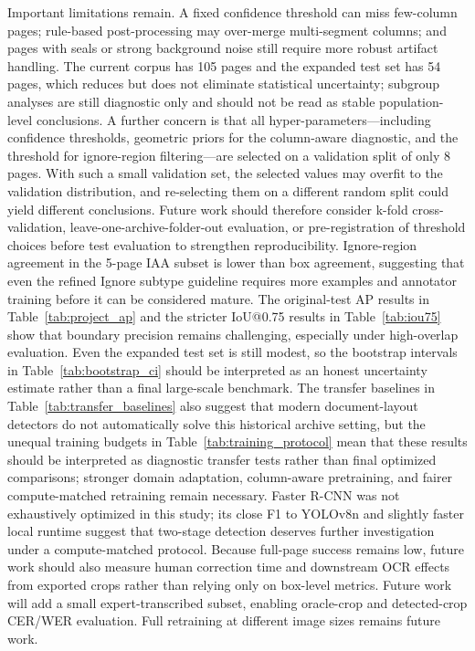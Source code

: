 \documentclass[pdflatex,sn-mathphys-num]{sn-jnl}
\begin{document}
Important limitations remain. A fixed confidence threshold can miss few-column pages; rule-based post-processing may over-merge multi-segment columns; and pages with seals or strong background noise still require more robust artifact handling. The current corpus has 105 pages and the expanded test set has 54 pages, which reduces but does not eliminate statistical uncertainty; subgroup analyses are still diagnostic only and should not be read as stable population-level conclusions. A further concern is that all hyper-parameters---including confidence thresholds, geometric priors for the column-aware diagnostic, and the threshold for ignore-region filtering---are selected on a validation split of only 8 pages. With such a small validation set, the selected values may overfit to the validation distribution, and re-selecting them on a different random split could yield different conclusions. Future work should therefore consider k-fold cross-validation, leave-one-archive-folder-out evaluation, or pre-registration of threshold choices before test evaluation to strengthen reproducibility. Ignore-region agreement in the 5-page IAA subset is lower than box agreement, suggesting that even the refined Ignore subtype guideline requires more examples and annotator training before it can be considered mature. The original-test AP results in Table~\ref{tab:project_ap} and the stricter IoU@0.75 results in Table~\ref{tab:iou75} show that boundary precision remains challenging, especially under high-overlap evaluation. Even the expanded test set is still modest, so the bootstrap intervals in Table~\ref{tab:bootstrap_ci} should be interpreted as an honest uncertainty estimate rather than a final large-scale benchmark. The transfer baselines in Table~\ref{tab:transfer_baselines} also suggest that modern document-layout detectors do not automatically solve this historical archive setting, but the unequal training budgets in Table~\ref{tab:training_protocol} mean that these results should be interpreted as diagnostic transfer tests rather than final optimized comparisons; stronger domain adaptation, column-aware pretraining, and fairer compute-matched retraining remain necessary. Faster R-CNN was not exhaustively optimized in this study; its close F1 to YOLOv8n and slightly faster local runtime suggest that two-stage detection deserves further investigation under a compute-matched protocol. Because full-page success remains low, future work should also measure human correction time and downstream OCR effects from exported crops rather than relying only on box-level metrics. Future work will add a small expert-transcribed subset, enabling oracle-crop and detected-crop CER/WER evaluation. Full retraining at different image sizes remains future work.
\end{document}
